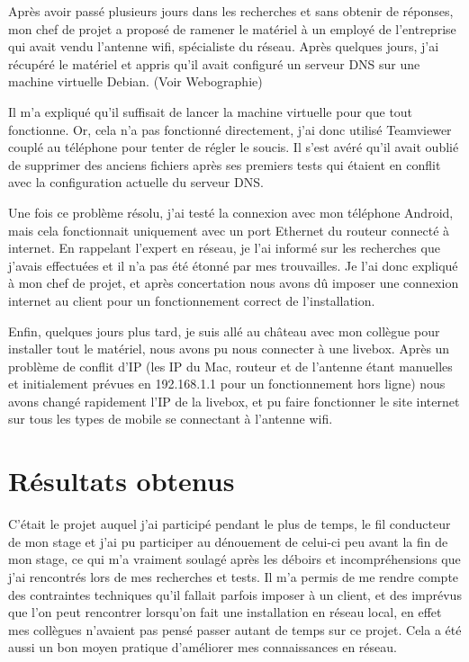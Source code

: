\documentclass[report]{tnreport}
\begin{document}
Après avoir passé plusieurs jours dans les recherches et sans obtenir de réponses, mon chef de projet a proposé de ramener le matériel à un employé de l’entreprise qui avait vendu l’antenne wifi, spécialiste du réseau. Après quelques jours, j’ai récupéré le matériel et appris qu’il avait configuré un serveur DNS sur une machine virtuelle Debian. (Voir Webographie)


Il m’a expliqué qu’il suffisait de lancer la machine virtuelle pour que tout fonctionne. Or, cela n’a pas fonctionné directement, j’ai donc utilisé Teamviewer couplé au téléphone pour tenter de régler le soucis. Il s’est avéré qu’il avait oublié de supprimer des anciens fichiers après ses premiers tests qui étaient en conflit avec la configuration actuelle du serveur DNS.


Une fois ce problème résolu, j’ai testé la connexion avec mon téléphone Android, mais cela fonctionnait uniquement avec un port Ethernet du routeur connecté à internet. En rappelant l’expert en réseau, je l’ai informé sur les recherches que j’avais effectuées et il n’a pas été étonné par mes trouvailles. Je l’ai donc expliqué à mon chef de projet, et après concertation nous avons dû imposer une connexion internet au client pour un fonctionnement correct de l’installation.


Enfin, quelques jours plus tard, je suis allé au château avec mon collègue pour installer tout le matériel, nous avons pu nous connecter à une livebox. Après un problème de conflit d’IP (les IP du Mac, routeur et de l’antenne étant manuelles et initialement prévues en 192.168.1.1 pour un fonctionnement hors ligne) nous avons changé rapidement l’IP de la livebox, et pu faire fonctionner le site internet sur tous les types de mobile se connectant à l’antenne wifi.


\section{Résultats obtenus}
C’était le projet auquel j’ai participé pendant le plus de temps, le fil conducteur de mon stage et j’ai pu participer au dénouement de celui-ci peu avant la fin de mon stage, ce qui m’a vraiment soulagé après les déboirs et incompréhensions que j’ai rencontrés lors de mes recherches et tests. Il m’a permis de me rendre compte des contraintes techniques qu’il fallait parfois imposer à un client, et des imprévus que l’on peut rencontrer lorsqu’on fait une installation en réseau local, en effet mes collègues n’avaient pas pensé passer autant de temps sur ce projet. Cela a été aussi un bon moyen pratique d’améliorer mes connaissances en réseau.
\end{document}
